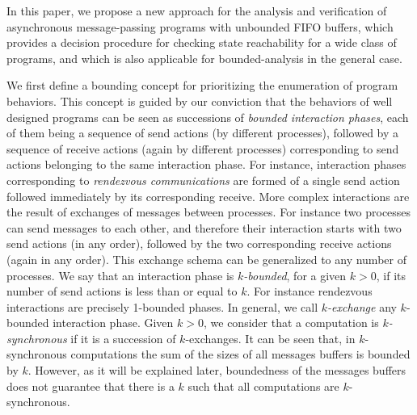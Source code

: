 In this paper, we propose a new approach for the analysis and verification of asynchronous message-passing programs with unbounded FIFO buffers, which provides a decision procedure for checking state reachability for a wide class of programs, and which is also applicable for bounded-analysis in the general case. 

We first define a bounding concept for prioritizing the enumeration of program behaviors. %
This concept is guided by our conviction that the behaviors of well designed programs can be seen as successions of {\em bounded interaction phases}, each of them being a sequence of send actions (by different processes), followed by a sequence of receive actions (again by different processes) corresponding to send actions belonging to the same interaction phase. For instance, interaction phases corresponding to {\em rendezvous communications} are formed of a single send action followed immediately by its corresponding receive. More complex interactions are the result of exchanges of messages between processes. For instance two processes can send messages to each other, and therefore their interaction starts with two send actions (in any order), followed by the two corresponding receive actions (again in any order). This exchange schema can 
be generalized to any number of processes. 
We say that an interaction phase is {\em $k$-bounded}, for a given $k > 0$, if its number of send actions is less than or equal to $k$. For instance rendezvous interactions are precisely 1-bounded phases.  In general, we call {\em $k$-exchange} any $k$-bounded interaction phase. 
%
Given $k > 0$, we consider that a computation is {\em $k$-synchronous} if it is a succession of $k$-exchanges.
It can be seen that, in $k$-synchronous computations the sum of the sizes of all messages buffers is bounded by $k$. However, as it will be explained later, boundedness of the messages buffers does not guarantee that there is a $k$ such that all computations are $k$-synchronous. 

